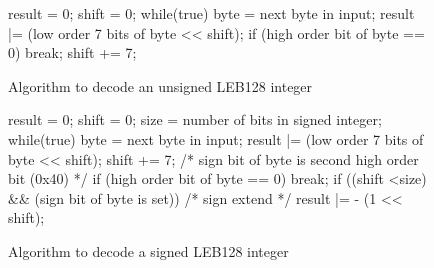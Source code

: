 \begin{figure}[ht]
\begin{nlnlisting}
result = 0;
shift = 0;
while(true)
{
    byte = next byte in input;
    result |= (low order 7 bits of byte << shift);
    if (high order bit of byte == 0)
        break;
    shift += 7;
}
\end{nlnlisting}
\caption{Algorithm to decode an unsigned LEB128 integer}
\end{figure}

\begin{figure}[ht]
\begin{nlnlisting}
result = 0;
shift = 0;
size = number of bits in signed integer;
while(true)
{
    byte = next byte in input;
    result |= (low order 7 bits of byte << shift);
    shift += 7;
    /* sign bit of byte is second high order bit (0x40) */
    if (high order bit of byte == 0)
        break;
}
if ((shift <size) && (sign bit of byte is set))
    /* sign extend */
    result |= - (1 << shift);
\end{nlnlisting}
\caption{Algorithm to decode a signed LEB128 integer}
\end{figure}
